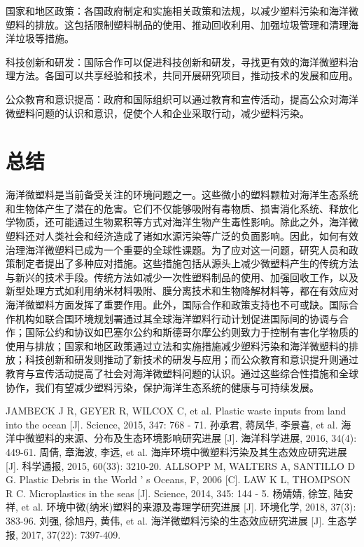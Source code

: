 \documentclass{article}
\begin{document}
    国家和地区政策：各国政府制定和实施相关政策和法规，以减少塑料污染和海洋微塑料的排放。这包括限制塑料制品的使用、推动回收利用、加强垃圾管理和清理海洋垃圾等措施。
    
    科技创新和研发：国际合作可以促进科技创新和研发，寻找更有效的海洋微塑料治理方法。各国可以共享经验和技术，共同开展研究项目，推动技术的发展和应用。
    
    公众教育和意识提高：政府和国际组织可以通过教育和宣传活动，提高公众对海洋微塑料问题的认识和意识，促使个人和企业采取行动，减少塑料污染。
    
    
    \section{总结}
    
    海洋微塑料是当前备受关注的环境问题之一。这些微小的塑料颗粒对海洋生态系统和生物体产生了潜在的危害。它们不仅能够吸附有毒物质、损害消化系统、释放化学物质，还可能通过生物累积等方式对海洋生物产生毒性影响。除此之外，海洋微塑料还对人类社会和经济造成了诸如水源污染等广泛的负面影响。因此，如何有效治理海洋微塑料已成为一个重要的全球性课题。为了应对这一问题，研究人员和政策制定者提出了多种应对措施。这些措施包括从源头上减少微塑料产生的传统方法与新兴的技术手段。传统方法如减少一次性塑料制品的使用、加强回收工作，以及新型处理方式如利用纳米材料吸附、膜分离技术和生物降解材料等，都在有效应对海洋微塑料方面发挥了重要作用。此外，国际合作和政策支持也不可或缺。国际合作机构如联合国环境规划署通过其全球海洋塑料行动计划促进国际间的协调与合作；国际公约和协议如巴塞尔公约和斯德哥尔摩公约则致力于控制有害化学物质的使用与排放；国家和地区政策通过立法和实施措施减少塑料污染和海洋微塑料的排放；科技创新和研发则推动了新技术的研发与应用；而公众教育和意识提升则通过教育与宣传活动提高了社会对海洋微塑料问题的认识。通过这些综合性措施和全球协作，我们有望减少塑料污染，保护海洋生态系统的健康与可持续发展。
    
    \begin{thebibliography}{9}
    	JAMBECK J R, GEYER R, WILCOX C, et al. Plastic waste inputs from land into the ocean [J]. Science, 2015, 347: 768 - 71. 
    	孙承君, 蒋凤华, 李景喜, et al. 海洋中微塑料的来源、分布及生态环境影响研究进展 [J]. 海洋科学进展, 2016, 34(4): 449-61.
    	周倩, 章海波, 李远, et al. 海岸环境中微塑料污染及其生态效应研究进展 [J]. 科学通报, 2015, 60(33): 3210-20.
    	ALLSOPP M, WALTERS A, SANTILLO D G. Plastic Debris in the World ’ s Oceans, F, 2006 [C].
    	LAW K L, THOMPSON R C. Microplastics in the seas [J]. Science, 2014, 345: 144 - 5.
    	杨婧婧, 徐笠, 陆安祥, et al. 环境中微(纳米)塑料的来源及毒理学研究进展 [J]. 环境化学, 2018, 37(3): 383-96.
    	刘强, 徐旭丹, 黄伟, et al. 海洋微塑料污染的生态效应研究进展 [J]. 生态学报, 2017, 37(22): 7397-409.
    \end{thebibliography}
    
\end{document}
